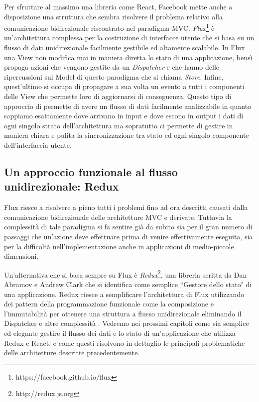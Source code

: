 Per sfruttare al massimo una libreria come React, Facebook mette anche a disposizione una struttura che sembra risolvere il problema relativo alla comunicazione bidirezionale riscontrato nel paradigma MVC. \textit{Flux}\footnote{https://facebook.github.io/flux} è un'architettura complessa per la costruzione di interfacce utente che si basa su un flusso di dati unidirezionale facilmente gestibile ed altamente scalabile. In Flux una View non modifica mai in maniera diretta lo stato di una applicazione, bensì propaga azioni che vengono gestite da un \textit{Dispatcher} e che hanno delle ripercussioni sul Model di questo paradigma che si chiama \textit{Store}. Infine, quest'ultimo si occupa di propagare a sua volta un evento a tutti i componenti delle View che permette loro di aggiornarsi di conseguenza. Questo tipo di approccio di permette di avere un flusso di dati facilmente analizzabile in quanto sappiamo esattamente dove arrivano in input e dove escono in output i dati di ogni singolo strato dell'architettura ma sopratutto ci permette di gestire in maniera chiara e pulita la sincronizzazione tra stato ed ogni singolo componente dell'interfaccia utente.

\subsection{Un approccio funzionale al flusso unidirezionale: Redux}
Flux riesce a risolvere a pieno tutti i problemi fino ad ora descritti causati dalla comunicazione bidirezionale delle architetture MVC e derivate. Tuttavia la complessità di tale paradigma si fa sentire già da subito sia per il gran numero di passaggi che un'azione deve effettuare prima di venire effettivamente eseguita, sia per la difficoltà nell'implementazione anche in applicazioni di medio-piccole dimensioni.

Un'alternativa che si basa sempre su Flux è \textit{Redux}\footnote{http://redux.js.org}, una libreria scritta da Dan Abramov e Andrew Clark che si identifica come semplice “Gestore dello stato" di una applicazione. Redux riesce a semplificare l'architettura di Flux utilizzando dei pattern della programmazione funzionale come la composizione e l'immutabilità per ottenere una struttura a flusso unidirezionale eliminando il Dispatcher e altre complessità \cite{AbramovOnReduxVsFlux}.
Vedremo nei prossimi capitoli come sia semplice ed elegante gestire il flusso dei dati e lo stato di un'applicazione che utilizza Redux e React, e come questi risolvono in dettaglio le principali problematiche delle architetture descritte precedentemente.